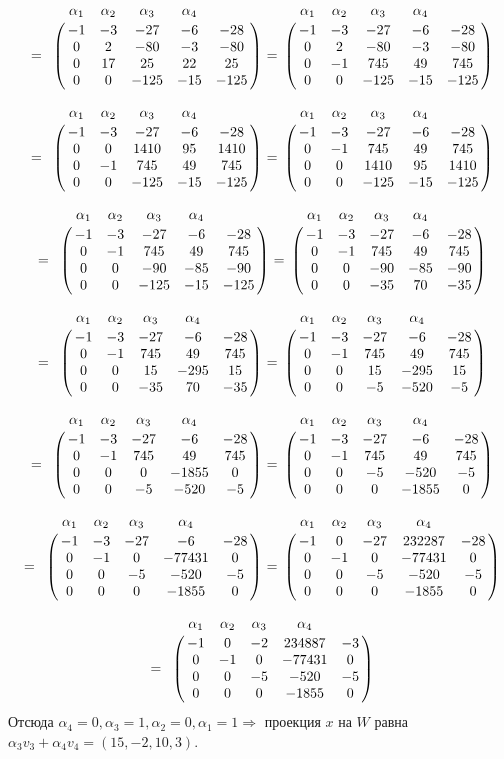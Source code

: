 \documentclass[10pt]{article}
\begin{document}
\[
\text{ = }
\bordermatrix{
	& \alpha_1 & \alpha_2 & \alpha_3 & \alpha_4 & \cr
	& -1 & -3 & -27 & -6 & -28 \cr
	& 0 & 2 & -80 & -3 & -80 \cr
	& 0 & 17 & 25 & 22 & 25 \cr
	& 0 & 0 & -125 & -15 & -125 \cr
}
\text{  =}
\bordermatrix{
	& \alpha_1 & \alpha_2 & \alpha_3 & \alpha_4 & \cr
	& -1 & -3 & -27 & -6 & -28 \cr
	& 0 & 2 & -80 & -3 & -80 \cr
	& 0 & -1 & 745 & 49 & 745 \cr
	& 0 & 0 & -125 & -15 & -125 \cr
}
\]

\[
\text{ = }
\bordermatrix{
	& \alpha_1 & \alpha_2 & \alpha_3 & \alpha_4 & \cr
	& -1 & -3 & -27 & -6 & -28 \cr
	& 0 & 0 & 1410 & 95 & 1410 \cr
	& 0 & -1 & 745 & 49 & 745 \cr
	& 0 & 0 & -125 & -15 & -125 \cr
}
\text{  =}
\bordermatrix{
	& \alpha_1 & \alpha_2 & \alpha_3 & \alpha_4 & \cr
	& -1 & -3 & -27 & -6 & -28 \cr
	& 0 & -1 & 745 & 49 & 745 \cr
	& 0 & 0 & 1410 & 95 & 1410 \cr
	& 0 & 0 & -125 & -15 & -125 \cr
}
\]

\[
\text{ = }
\bordermatrix{
	& \alpha_1 & \alpha_2 & \alpha_3 & \alpha_4 & \cr
	& -1 & -3 & -27 & -6 & -28 \cr
	& 0 & -1 & 745 & 49 & 745 \cr
	& 0 & 0 & -90 & -85 & -90 \cr
	& 0 & 0 & -125 & -15 & -125 \cr
}
\text{  =}
\bordermatrix{
	& \alpha_1 & \alpha_2 & \alpha_3 & \alpha_4 & \cr
	& -1 & -3 & -27 & -6 & -28 \cr
	& 0 & -1 & 745 & 49 & 745 \cr
	& 0 & 0 & -90 & -85 & -90 \cr
	& 0 & 0 & -35 & 70 & -35 \cr
}
\]

\[
\text{ = }
\bordermatrix{
	& \alpha_1 & \alpha_2 & \alpha_3 & \alpha_4 & \cr
	& -1 & -3 & -27 & -6 & -28 \cr
	& 0 & -1 & 745 & 49 & 745 \cr
	& 0 & 0 & 15 & -295 & 15 \cr
	& 0 & 0 & -35 & 70 & -35 \cr
}
\text{  =}
\bordermatrix{
	& \alpha_1 & \alpha_2 & \alpha_3 & \alpha_4 & \cr
	& -1 & -3 & -27 & -6 & -28 \cr
	& 0 & -1 & 745 & 49 & 745 \cr
	& 0 & 0 & 15 & -295 & 15 \cr
	& 0 & 0 & -5 & -520 & -5 \cr
}
\]

\[
\text{ = }
\bordermatrix{
	& \alpha_1 & \alpha_2 & \alpha_3 & \alpha_4 & \cr
	& -1 & -3 & -27 & -6 & -28 \cr
	& 0 & -1 & 745 & 49 & 745 \cr
	& 0 & 0 & 0 & -1855 & 0 \cr
	& 0 & 0 & -5 & -520 & -5 \cr
}
\text{  =}
\bordermatrix{
	& \alpha_1 & \alpha_2 & \alpha_3 & \alpha_4 & \cr
	& -1 & -3 & -27 & -6 & -28 \cr
	& 0 & -1 & 745 & 49 & 745 \cr
	& 0 & 0 & -5 & -520 & -5 \cr
	& 0 & 0 & 0 & -1855 & 0 \cr
}
\]

\[
\text{ = }
\bordermatrix{
	& \alpha_1 & \alpha_2 & \alpha_3 & \alpha_4 & \cr
	& -1 & -3 & -27 & -6 & -28 \cr
	& 0 & -1 & 0 & -77431 & 0 \cr
	& 0 & 0 & -5 & -520 & -5 \cr
	& 0 & 0 & 0 & -1855 & 0 \cr
}
\text{  =}
\bordermatrix{
	& \alpha_1 & \alpha_2 & \alpha_3 & \alpha_4 & \cr
	& -1 & 0 & -27 & 232287 & -28 \cr
	& 0 & -1 & 0 & -77431 & 0 \cr
	& 0 & 0 & -5 & -520 & -5 \cr
	& 0 & 0 & 0 & -1855 & 0 \cr
}
\]

\[
\text{ = }
\bordermatrix{
	& \alpha_1 & \alpha_2 & \alpha_3 & \alpha_4 & \cr
	& -1 & 0 & -2 & 234887 & -3 \cr
	& 0 & -1 & 0 & -77431 & 0 \cr
	& 0 & 0 & -5 & -520 & -5 \cr
	& 0 & 0 & 0 & -1855 & 0 \cr
}
\]
Отсюда $\alpha_4 = 0, \alpha_3 = 1, \alpha_2 = 0, \alpha_1 = 1 \Rightarrow $ проекция $x$ на $W$ равна $\alpha_3 v_3 + \alpha_4 v_4 = (15, -2, 10, 3)$. 
\end{document}
